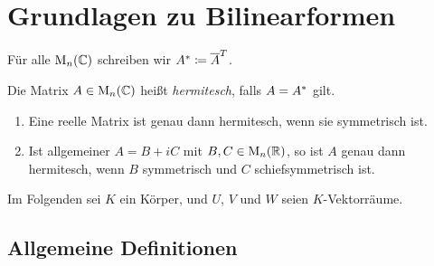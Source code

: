 \chapter{Grundlagen zu Bilinearformen}

\begin{notation}
  Für alle $\operatorname{M}_{n}(\mathbb{C})$ schreiben wir $A^* \coloneqq \overline{A}^T$.
\end{notation}

\begin{definition}
  Die Matrix $A \in \operatorname{M}_{n}(\mathbb{C})$ heißt \emph{hermitesch}, falls $A = A^*$ gilt.
\end{definition}

\begin{example}
  \leavevmode
  \begin{enumerate}
    \item
      Eine reelle Matrix ist genau dann hermitesch, wenn sie symmetrisch ist.
    \item
      Ist allgemeiner $A = B + iC$ mit $B, C \in \operatorname{M}_{n}(\mathbb{R})$, so ist $A$ genau dann hermitesch, wenn $B$ symmetrisch und $C$ schiefsymmetrisch ist.
  \end{enumerate}
\end{example}

Im Folgenden sei $K$ ein Körper, und $U$, $V$ und $W$ seien $K$-Vektorräume.





\section{Allgemeine Definitionen}


